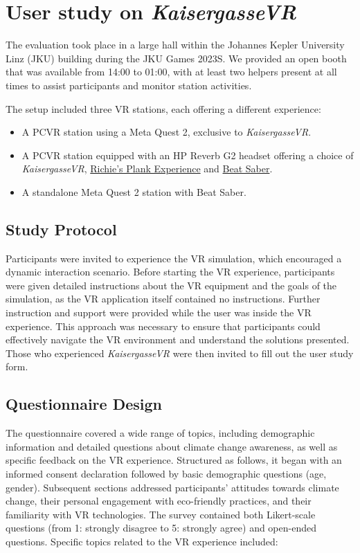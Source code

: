\documentclass[draft, final]{vutinfth} %
\begin{document}
\section{User study on \textit{KaisergasseVR}}
The evaluation took place in a large hall within the Johannes Kepler University Linz (JKU) building during the JKU Games 2023S. We provided an open booth that was available from 14:00 to 01:00, with at least two helpers present at all times to assist participants and monitor station activities.

The setup included three VR stations, each offering a different experience:

\begin{itemize}
    \item A PCVR station using a Meta Quest 2, exclusive to \textit{KaisergasseVR}.
    \item A PCVR station equipped with an HP Reverb G2 headset offering a choice of \textit{KaisergasseVR}, \hyperlink{https://store.steampowered.com/app/517160/Richies_Plank_Experience/}{Richie's Plank Experience} and \hyperlink{https://store.steampowered.com/app/620980/Beat_Saber/}{Beat Saber}.
   \item A standalone Meta Quest 2 station with Beat Saber.
\end{itemize}

\subsection{Study Protocol}

Participants were invited to experience the VR simulation, which encouraged a dynamic interaction scenario. Before starting the VR experience, participants were given detailed instructions about the VR equipment and the goals of the simulation, as the VR application itself contained no instructions. Further instruction and support were provided while the user was inside the VR experience. This approach was necessary to ensure that participants could effectively navigate the VR environment and understand the solutions presented. Those who experienced \textit{KaisergasseVR} were then invited to fill out the user study form.

\subsection{Questionnaire Design}

The questionnaire covered a wide range of topics, including demographic information and detailed questions about climate change awareness, as well as specific feedback on the VR experience. Structured as follows, it began with an informed consent declaration followed by basic demographic questions (age, gender). Subsequent sections addressed participants' attitudes towards climate change, their personal engagement with eco-friendly practices, and their familiarity with VR technologies. The survey contained both Likert-scale questions (from 1: strongly disagree to 5: strongly agree) and open-ended questions. Specific topics related to the VR experience included:
\end{document}
